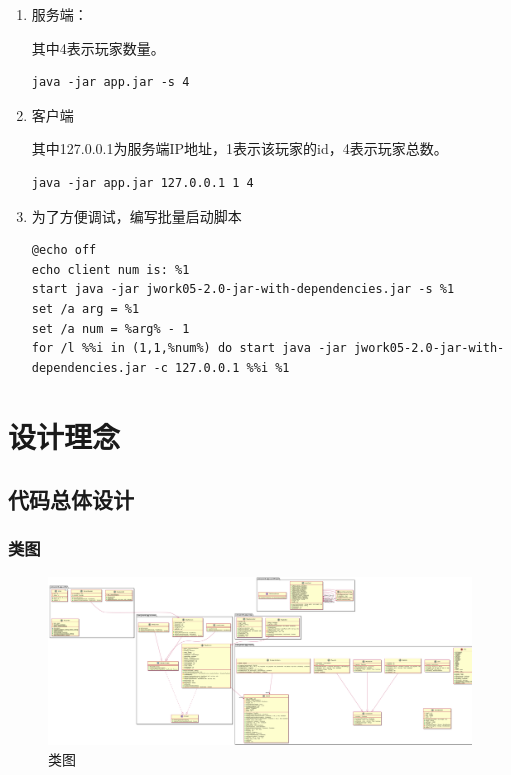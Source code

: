 \documentclass{SCIS2022cn}
\begin{document}
\begin{enumerate}
\item 服务端：

其中4表示玩家数量。

\lstset{language=bash,numbers=none}
\begin{lstlisting}
java -jar app.jar -s 4
\end{lstlisting}

\item 客户端

其中127.0.0.1为服务端IP地址，1表示该玩家的id，4表示玩家总数。

\begin{lstlisting}
java -jar app.jar 127.0.0.1 1 4
\end{lstlisting}

\item 为了方便调试，编写批量启动脚本

\lstset{language=bash,numbers=left}
\begin{lstlisting}
@echo off
echo client num is: %1
start java -jar jwork05-2.0-jar-with-dependencies.jar -s %1
set /a arg = %1
set /a num = %arg% - 1
for /l %%i in (1,1,%num%) do start java -jar jwork05-2.0-jar-with-dependencies.jar -c 127.0.0.1 %%i %1
\end{lstlisting}

\end{enumerate}

\section{设计理念}

\subsection{代码总体设计}

\subsubsection{类图}

\begin{figure}[H]
    \centering
    \includegraphics[width=1\textwidth]{ref/2-1-1-1.png}
    \caption{类图}
    \label{Fig.f2111}
\end{figure}
\end{document}
